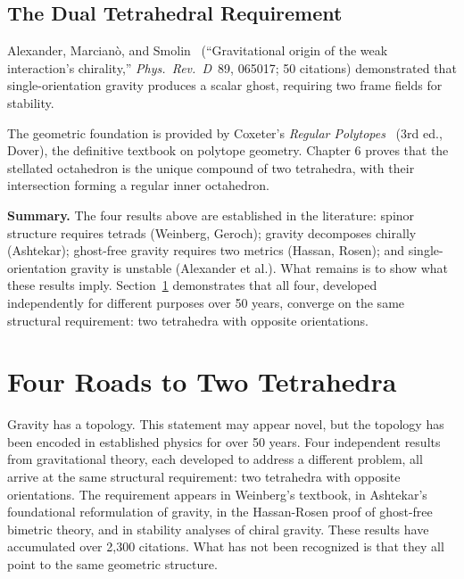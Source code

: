 \documentclass[aps,prd,preprint,superscriptaddress,showpacs,preprintnumbers,amsmath,amssymb,nofootinbib]{revtex4-2}
\begin{document}
\subsection{The Dual Tetrahedral Requirement}
\label{subsec:dual-foundation}

Alexander, Marcian\`o, and Smolin~\cite{alexander2014} (``Gravitational origin of the weak interaction's chirality,'' \emph{Phys.\ Rev.\ D}\ 89, 065017; 50 citations) demonstrated that single-orientation gravity produces a scalar ghost, requiring two frame fields for stability.

The geometric foundation is provided by Coxeter's \emph{Regular Polytopes}~\cite{coxeter1973} (3rd ed., Dover), the definitive textbook on polytope geometry. Chapter 6 proves that the stellated octahedron is the unique compound of two tetrahedra, with their intersection forming a regular inner octahedron.

\vspace{1em}
\noindent\textbf{Summary.} The four results above are established in the literature: spinor structure requires tetrads (Weinberg, Geroch); gravity decomposes chirally (Ashtekar); ghost-free gravity requires two metrics (Hassan, Rosen); and single-orientation gravity is unstable (Alexander et al.). What remains is to show what these results imply. Section~\ref{sec:four-roads} demonstrates that all four, developed independently for different purposes over 50 years, converge on the same structural requirement: two tetrahedra with opposite orientations.

\section{Four Roads to Two Tetrahedra}
\label{sec:four-roads}

Gravity has a topology. This statement may appear novel, but the topology has been encoded in established physics for over 50 years. Four independent results from gravitational theory, each developed to address a different problem, all arrive at the same structural requirement: two tetrahedra with opposite orientations. The requirement appears in Weinberg's textbook, in Ashtekar's foundational reformulation of gravity, in the Hassan-Rosen proof of ghost-free bimetric theory, and in stability analyses of chiral gravity. These results have accumulated over 2,300 citations. What has not been recognized is that they all point to the same geometric structure.
\end{document}
